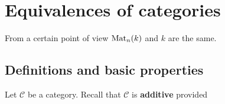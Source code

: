 %





\chapter{Equivalences of categories}


From a certain point of view $\operatorname{Mat}_n(k)$ and $k$ are the same.



\section{Definitions and basic properties}


Let $\mathcal{C}$ be a category. Recall that $\mathcal{C}$ is \textbf{additive} provided

